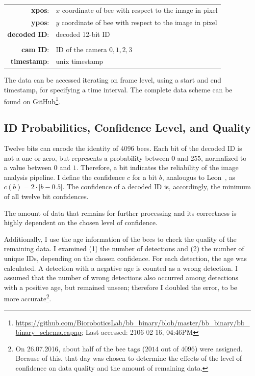 \begin{table}[!h]
\centering
\begin{tabular}{rl}
\textbf{xpos}: & $x$ coordinate of bee with respect to the image in pixel \\
\textbf{ypos}: & $y$ coordinate of bee with respect to the image in pixel \\
\textbf{decoded ID}: & decoded 12-bit ID \\
\\
\textbf{cam ID}: & ID of the camera ${0,1,2,3}$ \\
\textbf{timestamp}: & unix timestamp \\
\end{tabular}
\end{table}

The data can be accessed iterating on frame level, using a start and end time\-stamp, for specifying a time interval. The complete data scheme can be found on GitHub\footnote{\url{https://github.com/BioroboticsLab/bb_binary/blob/master/bb_binary/bb_binary_schema.capnp}; Last accessed: 2106-02-16, 04:46PM}. 

\subsection{ID Probabilities, Confidence Level, and Quality}
\label{subsec:confidence}

Twelve bits can encode the identity of 4096 bees.
Each bit of the decoded ID is not a one or zero, but represents a probability between $0$ and $255$, normalized to a value between $0$ and $1$. Therefore, a bit indicates the reliability of the image analysis pipeline.
I define the confidence $c$ for a bit $b$, analougus to Leon~\textcite[p.~14]{leon2016}, as $c(b)=2\cdot|b-0.5|$. The confidence of a decoded ID is, accordingly, the minimum of all twelve bit confidences.

The amount of data that remains for further processing and its correctness is highly dependent on the chosen level of confidence.

Additionally, I use the age information of the bees to check the quality of the remaining data. 
I examined (1) the number of detections and (2) the number of unique IDs, depending on the chosen confidence.
For each detection, the age was calculated. A detection with a negative age is counted as a wrong detection. I assumed that the number of wrong detections also occurred among detections with a positive age, but remained unseen; therefore I doubled the error, to be more accurate\footnote{On 26.07.2016, about half of the bee tags ($2014$ out of $4096$) were assigned. Because of this, that day was chosen to determine the effects of the level of confidence on data quality and the amount of remaining data.}. 

